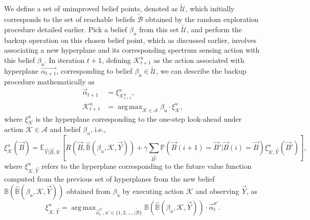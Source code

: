 \documentclass[12pt, draftcls, onecolumn]{IEEEtran}
\DeclareMathOperator*{\argmax}{arg\,max}
\begin{document}
We define a set of unimproved belief points, denoted as $\tilde{\mathcal{U}}$, which initially corresponds to the set of reachable beliefs $\tilde{\mathcal{B}}$ obtained by the random exploration procedure detailed earlier. Pick a belief $\beta_{u}$ from this set $\tilde{\mathcal{U}}$, and perform the backup operation on this chosen belief point, which as discussed earlier, involves associating a new hyperplane and its corresponding spectrum sensing action with this belief $\beta_{u}$. In iteration $t+1$, defining $\mathcal{K}_{t+1}^{u}$ as the action associated with hyperplane $\vec{\alpha_{t+1}}$, corresponding to belief $\beta_{u}{\in}\tilde{\mathcal{U}}$, we can describe the backup procedure mathematically as
\begin{equation}\label{25}
    \begin{aligned}
        \vec{\alpha}_{t+1}&=\xi_{\mathcal{K}_{t+1}^{u}}^{u},\\
        \mathcal{K}_{t+1}^{u}&=\argmax_{\mathcal{K} \in \mathcal{A}}\beta_{u} \cdot \xi_{\mathcal{K}}^{u},
    \end{aligned}
\end{equation}
where $\xi_{\mathcal{K}}^{u}$ is the hyperplane corresponding to the one-step look-ahead under action $\mathcal{K}{\in}\mathcal{A}$ and belief $\beta_{u}$, i.e.,
\begin{equation}\label{26}
    \xi_{\mathcal{K}}^{u}(\vec{B})=\mathbb{E}_{\vec{Y}|\vec{B},\mathcal{K}}\left[R(\vec{B},\hat{\mathbb{B}}(\beta_{u},\mathcal{K},\vec{Y}))+\gamma \sum_{\vec{B}'}\mathbb{P}(\vec{B}(i+1)=\vec{B}'|\vec{B}(i)=\vec{B})\xi_{\mathcal{K},\vec{Y}}^{u}(\vec{B}')\right],
\end{equation}
where $\xi_{\mathcal{K},\vec{Y}}^{u}$ refers to the hyperplane corresponding to the future value function computed from the previous set of hyperplanes from the new belief $\mathbb{B}(\hat{\mathbb{B}}(\beta_{u},\mathcal{K},\vec{Y}))$ obtained from $\beta_{u}$ by executing action $\mathcal{K}$ and observing $\vec{Y}$, as
\begin{equation}\label{27}
    \xi_{\mathcal{K},\vec{Y}}^{u}=\argmax_{\vec{\alpha}_{t}^{u'},u' \in \{1,2,\dots,|\tilde{\mathcal{B}}\}}\mathbb{B}(\hat{\mathbb{B}}(\beta_{u},\mathcal{K},\vec{Y})) \cdot \vec{\alpha}_{t}^{u'}.
\end{equation}
\end{document}
